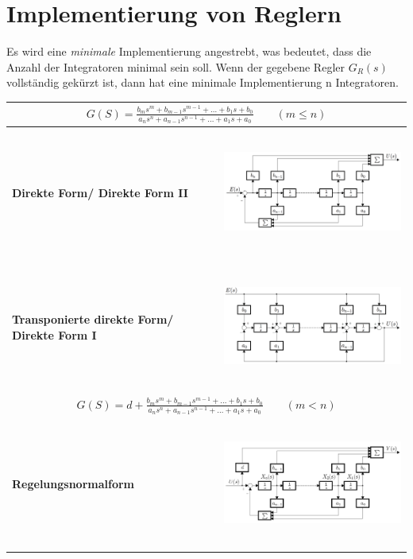 \section{Implementierung von Reglern }
Es wird eine \textit{minimale} Implementierung angestrebt, was bedeutet, dass die Anzahl
der Integratoren minimal sein soll. Wenn der gegebene Regler $G_R(s)$ vollständig
gekürzt ist, dann hat eine minimale Implementierung n Integratoren.

\begin{center}
	\begin{tabu}{|p{0.25\textwidth}|p{0.7\textwidth}|}
	\hline
	\\[2mm]
	\hline
	\bf{Direkte Form/ Direkte Form II}
		& \includegraphics[width = \linewidth, height = 4.2cm, trim = 0 0 0 -5]{./images/DirekteForm2}\\[2mm]
	\hline
	\bf{Transponierte direkte Form/ Direkte Form I}
		& \includegraphics[width = \linewidth, height = 4.2cm, trim = 0 0 0 -5]{./images/DirekteForm1}\\[2mm]
	\hline
	\\[2mm]
	\hline
	\textbf{Regelungsnormalform}
		& \includegraphics[width = \linewidth, height = 4.2cm, trim = 0 0 0 -5]{./images/regelungsnormalform}\\[2mm]
	\hline
	\end{tabu}
\end{center}
